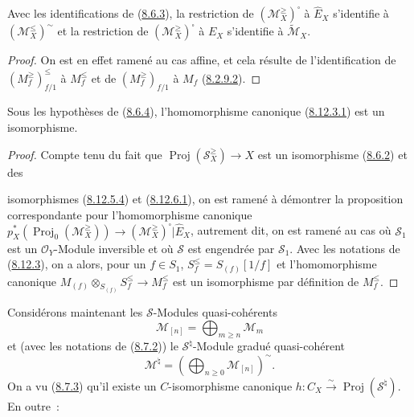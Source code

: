 \begin{corollary}[8.12.7]
\label{II.8.12.7-fr}
Avec les identifications de (\hyperref[II.8.6.3-fr]{8.6.3}), la restriction
de $(\mathcal{M}_X^{\geq})^{\square}$ à $\widehat{E}_X$ s'identifie à
$(\mathcal{M}_X^{\leq})^{\sim}$ et la restriction de
$(\mathcal{M}_X^{\geq})^{\square}$ à $E_X$ s'identifie à
$\widetilde{\mathcal{M}}_X$.
\end{corollary}

\begin{proof}
On est en effet ramené au cas affine, et cela résulte de l'identification de
$(M_f^{\geq})_{f/1}^{\leq}$ à $M_f^{\leq}$ et de
$(M_f^{\geq})_{f/1}$ à $M_f$ (\hyperref[II.8.2.9.2-fr]{8.2.9.2}).
\end{proof}

\begin{proposition}[8.12.8]
\label{II.8.12.8-fr}
Sous les hypothèses de (\hyperref[II.8.6.4-fr]{8.6.4}), l'homomorphisme
canonique (\hyperref[II.8.12.3.1-fr]{8.12.3.1}) est un isomorphisme.
\end{proposition}

\begin{proof}
Compte tenu du fait que $\operatorname{Proj}(\mathcal{S}_X^{\geq})\to X$
est un isomorphisme (\hyperref[II.8.6.2-fr]{8.6.2}) et des

isomorphismes (\hyperref[II.8.12.5.4-fr]{8.12.5.4}) et
(\hyperref[II.8.12.6.1-fr]{8.12.6.1}), on est ramené à démontrer la
proposition correspondante pour l'homomorphisme canonique
$p_X^*(\operatorname{Proj}_0(\mathcal{M}_X^{\geq}))
\to(\mathcal{M}_X^{\geq})^{\square}|\widehat{E}_X$, autrement dit, on est
ramené au cas où $\mathcal{S}_1$ est un $\mathcal{O}_Y$-Module inversible et
où $\mathcal{S}$ est engendrée par $\mathcal{S}_1$. Avec les notations de
(\hyperref[II.8.12.3-fr]{8.12.3}), on a alors, pour un $f\in S_1$,
$S_f^{\leq}=S_{(f)}[1/f]$ et l'homomorphisme canonique
$M_{(f)}\otimes_{S_{(f)}}S_f^{\leq}\to M_f^{\leq}$ est un isomorphisme par
définition de $M_f^{\leq}$.
\end{proof}

\begin{env}[8.12.9]
\label{II.8.12.9-fr}
Considérons maintenant les $\mathcal{S}$-Modules quasi-cohérents
\[
  \mathcal{M}_{[n]}=\bigoplus_{m\geqslant n}\mathcal{M}_m
\]
et (avec les notations de (\hyperref[II.8.7.2-fr]{8.7.2})) le
$\mathcal{S}^{\natural}$-Module gradué quasi-cohérent
\begin{equation}
\label{II.8.12.9.1-fr}
  \mathcal{M}^{\natural}
  =\left(\bigoplus_{n\geqslant0}\mathcal{M}_{[n]}\right)^{\sim}.
\tag{8.12.9.1}
\end{equation}
On a vu (\hyperref[II.8.7.3-fr]{8.7.3}) qu'il existe un $C$-isomorphisme
canonique $h:C_X\xrightarrow{\sim}\operatorname{Proj}(\mathcal{S}^{\natural})$.
En outre~:
\end{env}

